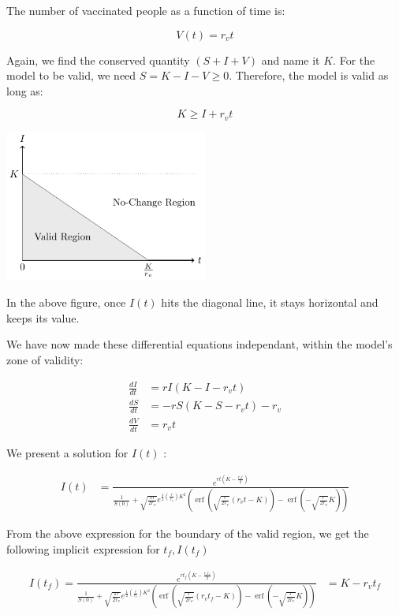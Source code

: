 \documentclass{article}
\DeclareMathOperator\erf{erf}
\begin{document}
The number of vaccinated people as a function of time is:

\[ V(t) = r_v t \]

Again, we find the conserved quantity $\left( S + I + V \right)$ and
	name it $K$.
For the model to be valid, we need $S = K - I - V \geq 0$.
Therefore, the model is valid as long as:

\[ K \geq I + r_v t \]

\includegraphics[width=0.5\textwidth]{figures/admissible-region.pdf}

In the above figure, once $I(t)$ hits the diagonal line,
	it stays horizontal and keeps its value.

We have now made these differential equations independant,
	within the model's zone of validity:

\begin{align*}
\frac{dI}{dt} & = r I \left( K - I - r_v t \right)\\
\frac{dS}{dt} & = - r S \left( K - S - r_v t \right) - r_v \\
\frac{dV}{dt} & = r_v t
\end{align*}

We present a solution for $I(t)$ \cite{walph}:

\begin{align}
I(t) & =
	\frac{e^{ r t (K - \frac{ r_v t}{2})}}
	{\frac{1}{S(0)} + \sqrt{\frac{\pi r}{2 r_v}}
		e^{\frac12 \left( \frac{r}{r_v} \right) K^2}
		\left(\erf\left(  \sqrt{\frac{r}{2 r_v}} (r_v t - K ) \right)
			- \erf\left( - \sqrt{\frac{r}{2 r_v}} K \right) \right)}
\end{align}

From the above expression for the boundary of the valid region,
	we get the following implicit expression for $t_f, I(t_f)$

\begin{align}
I(t_f) =
	\frac{e^{ r t_f (K - \frac{ r_v t_f }{2})}}
	{\frac{1}{S(0)} + \sqrt{\frac{\pi r}{2 r_v}}
		e^{\frac12 \left( \frac{r}{r_v} \right) K^2}
		\left(\erf\left(  \sqrt{\frac{r}{2 r_v}} (r_v t_f - K ) \right)
			- \erf\left( - \sqrt{\frac{r}{2 r_v}} K \right) \right)}
	& = K - r_v t_f
\end{align}
\end{document}
